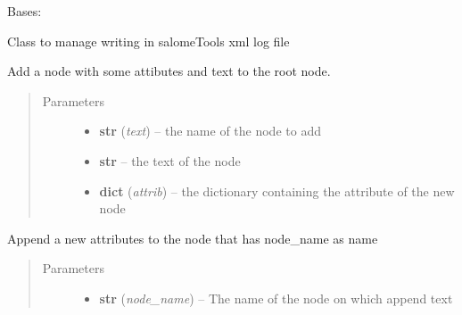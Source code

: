 \documentclass[a4paper,10pt,english]{sphinxmanual}
\begin{document}
\begin{fulllineitems}
\label{commands/apidoc/src:src.xmlManager.XmlLogFile}
Bases: 

Class to manage writing in salomeTools xml log file

\begin{fulllineitems}
\label{commands/apidoc/src:src.xmlManager.XmlLogFile.add_simple_node}
Add a node with some attibutes and text to the root node.
\begin{quote}\begin{description}
\item[{Parameters}] \leavevmode\begin{itemize}
\item {} 
\textbf{str} (\emph{text}) -- the name of the node to add

\item {} 
\textbf{str} -- the text of the node

\item {} 
\textbf{dict} (\emph{attrib}) -- the dictionary containing the 
attribute of the new node

\end{itemize}

\end{description}\end{quote}

\end{fulllineitems}


\begin{fulllineitems}
\label{commands/apidoc/src:src.xmlManager.XmlLogFile.append_node_attrib}
Append a new attributes to the node that has node\_name as name
\begin{quote}\begin{description}
\item[{Parameters}] \leavevmode\begin{itemize}
\item {} 
\textbf{str} (\emph{node\_name}) -- The name of the node on which append text


\end{itemize}
\end{description}
\end{quote}
\end{fulllineitems}
\end{fulllineitems}
\end{document}
